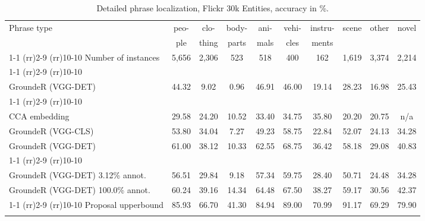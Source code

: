 \newcommand{\midruleValLong}{\cmidrule(rr){1-1} \cmidrule(rr){2-9} \cmidrule(rr){10-10}}
\begin{table}[t]
\scriptsize
\center
\begin{tabular}{lccccccccc}
\toprule
Phrase type & peo- & clo- & body- & ani- & vehi- & instru- & scene & other & novel \\
  & ple & thing & parts & mals & cles & ments &  &  &  \\
\midruleValLong
Number of instances & 5,656 & 2,306 & 523 & 518 & 400 & 162 & 1,619 & 3,374 & 2,214 \\
\midruleValLong
\multicolumn{10}{l}{\textbf{Unsupervised training}} \\
GroundeR (\tiny{VGG-DET}) & 44.32 & 9.02 & 0.96 & 46.91 & 46.00 & 19.14 & 28.23 & 16.98 & 25.43 \\
\midruleValLong
\multicolumn{10}{l}{\textbf{Supervised training}} \\
CCA embedding \cite{plummer15iccv} & 29.58 & 24.20 & 10.52 & 33.40 & 34.75 & 35.80 & 20.20 & 20.75 & n/a \\
GroundeR (\tiny{VGG-CLS}) & 53.80 & 34.04 & 7.27 & 49.23 & 58.75 & 22.84 & 52.07 & 24.13 & 34.28 \\
GroundeR (\tiny{VGG-DET}) & 61.00 & 38.12 & 10.33 & 62.55 & 68.75 & 36.42 & 58.18 & 29.08 & 40.83 \\
\midruleValLong
\multicolumn{2}{l}{\textbf{Semi-supervised training}} \\
GroundeR (\tiny{VGG-DET}) \scriptsize{3.12\% annot.} & 56.51 & 29.84 & 9.18 & 57.34 & 59.75 & 28.40 & 50.71 & 24.48 & 34.28 \\
GroundeR (\tiny{VGG-DET}) \scriptsize{100.0\% annot.} & 60.24 & 39.16 & 14.34 & 64.48 & 67.50 & 38.27 & 59.17 & 30.56 & 42.37 \\
\midruleValLong
Proposal upperbound & 85.93 & 66.70 & 41.30 & 84.94 & 89.00 & 70.99 & 91.17 & 69.29 & 79.90 \\
\bottomrule\\
\end{tabular}
\caption{Detailed phrase localization, Flickr 30k Entities, accuracy in \%.}
\label{tbl:testset}
\end{table}


